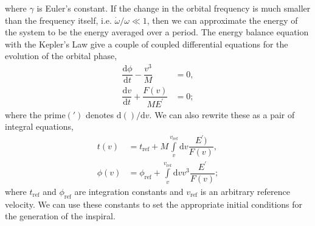 \documentclass[aps,
prd,
amsmath,
amssymb,
twocolumn,
floatfix,
groupedaddress]{revtex4-1}
\newcommand{\Int}{\displaystyle\int\limits}
\newcommand{\D}{\mathrm{d}}
\newcommand{\refr}{\mathrm{ref}}
\begin{document}
where $\gamma$ is Euler's constant. If the change in the orbital frequency is much smaller than the frequency itself,
i.e. $\dot{\omega}/\omega \ll 1$, then we can approximate the energy of the system to be the energy averaged over a period.
The energy balance equation with the Kepler's Law give a couple of coupled differential equations for the evolution of the orbital phase,
\begin{subequations}\label{eq:PNOrbitalEvolution01}
\begin{align}
\dfrac{\D\phi}{\D t} - \dfrac{v^3}{M} &= 0,\label{eq:PNOrbitalEvolution01_01}\\
\dfrac{\D v}{\D t} + \dfrac{F(v)}{ME^{\prime}} &= 0;\label{eq:PNOrbitalEvolution01_02}
\end{align}
\end{subequations}
where the prime$(\prime)$ denotes $\D()/\D v$. We can also rewrite these as a pair of integral equations,
\begin{subequations}\label{eq:PNOrbitalEvolution02}
\begin{align}
t(v) &= t_{\refr} + M\Int_v^{v_{\refr}}\D v\dfrac{E^{\prime})}{F(v)},\label{eq:PNOrbitalEvolution02_01}\\
\phi(v) &= \phi_{\refr} + \Int_v^{v_{\refr}}\D v v^3\dfrac{E^{\prime}}{F(v)};\label{eq:PNOrbitalEvolution02_02}
\end{align}
\end{subequations}
where $t_{\refr}$ and $\phi_{\refr}$ are integration constants and $v_{\refr}$ is an arbitrary reference velocity.
We can use these constants to set the appropriate initial conditions for the generation of the inspiral.
%
%
%
\end{document}
